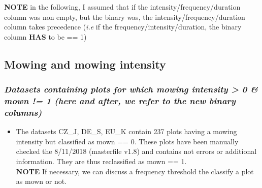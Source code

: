 \documentclass[table]{article}
\newenvironment{Shaded}{\begin{snugshade}}{\end{snugshade}}
\newcommand{\KeywordTok}[1]{\textcolor[rgb]{0.13,0.29,0.53}{\textbf{#1}}}
\newcommand{\DataTypeTok}[1]{\textcolor[rgb]{0.13,0.29,0.53}{#1}}
\newcommand{\DecValTok}[1]{\textcolor[rgb]{0.00,0.00,0.81}{#1}}
\newcommand{\StringTok}[1]{\textcolor[rgb]{0.31,0.60,0.02}{#1}}
\newcommand{\OperatorTok}[1]{\textcolor[rgb]{0.81,0.36,0.00}{\textbf{#1}}}
\newcommand{\NormalTok}[1]{#1}
\providecommand{\tightlist}{%
  \setlength{\itemsep}{0pt}\setlength{\parskip}{0pt}}
\begin{document}
\textbf{NOTE} in the following, I assumed that if the
intensity/frequency/duration column was non empty, but the binary was,
the intensity/frequency/duration column takes precedence (\emph{i.e} if
the frequency/intensity/duration, the binary column \textbf{HAS} to be
== 1)

\subsection{Mowing and mowing
intensity}\label{mowing-and-mowing-intensity}

\subsubsection{\texorpdfstring{\emph{Datasets containing plots for which
mowing intensity \textgreater{} 0 \& mown != 1 (here and after, we refer
to the new binary
columns)}}{Datasets containing plots for which mowing intensity \textgreater{} 0 \& mown != 1 (here and after, we refer to the new binary columns)}}\label{datasets-containing-plots-for-which-mowing-intensity-0-mown-1-here-and-after-we-refer-to-the-new-binary-columns}

\begin{itemize}
\tightlist
\item
  The datasets CZ\_J, DE\_S, EU\_K contain 237 plots having a mowing
  intensity but classified as mown == 0. These plots have been manually
  checked the 8/11/2018 (masterfile v1.8) and contains not errors or
  additional information. They are thus reclassified as mown == 1.\\
  \textbf{NOTE} If necessary, we can discuss a frequency threshold the
  classify a plot as mown or not.
\end{itemize}

\begin{Shaded}
\end{Shaded}
\end{document}

